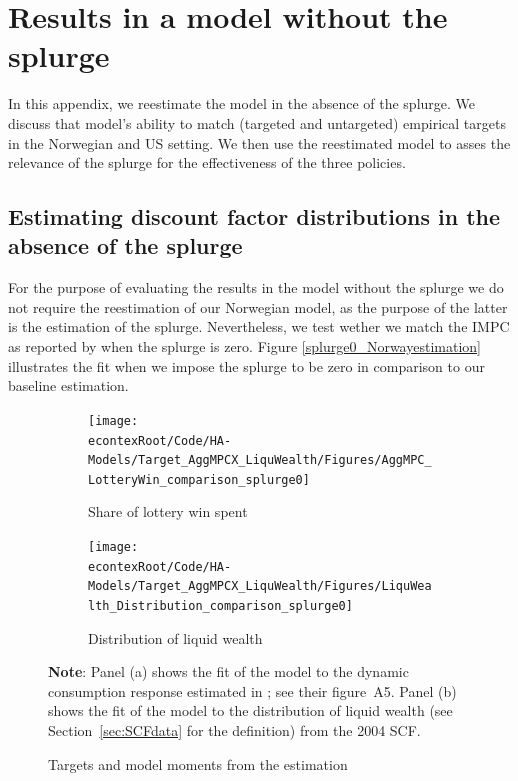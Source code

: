 \documentclass[\econtexRoot/HAFiscal]{subfiles}
\begin{document}
\FloatBarrier

\hypertarget{Model_without_splurge}{}\par\section{Results in a model without the splurge}
\notinsubfile{\label{app:Model_without_splurge}}

In this appendix, we reestimate the model in the absence of the splurge. We discuss that model's ability to match (targeted and untargeted) empirical targets in the Norwegian and US setting. We then use the reestimated model to asses the relevance of the splurge for the effectiveness of the three policies. 


\subsection{Estimating discount factor distributions in the absence of the splurge}

For the purpose of evaluating the results in the model without the splurge we do not require the reestimation of our Norwegian model, as the purpose of the latter is the estimation of the splurge. Nevertheless, we test wether we match the IMPC as reported by \citet{fagereng_mpc_2021} when the splurge is zero. Figure \ref{splurge0_Norwayestimation} illustrates the fit when we impose the splurge to be zero in comparison to our baseline estimation. 

\begin{figure}[htb]
	\centering
	\begin{subfigure}[b]{.48\linewidth}
		\centering
		\texttt{[image: \\econtexRoot/Code/HA-Models/Target\_AggMPCX\_LiquWealth/Figures/AggMPC\_LotteryWin\_comparison\_splurge0]}
		\caption{Share of lottery win spent}
		\notinsubfile{\label{fig:aggmpclotterywin}}
	\end{subfigure}
	\begin{subfigure}[b]{.48\linewidth}
		\centering
		\texttt{[image: \\econtexRoot/Code/HA-Models/Target\_AggMPCX\_LiquWealth/Figures/LiquWealth\_Distribution\_comparison\_splurge0]}
		\caption{Distribution of liquid wealth}
		\notinsubfile{\label{fig:liquwealthdistribution}}
	\end{subfigure}%
	\caption{Targets and model moments from the estimation}
	\notinsubfile{\label{fig:splurge0_Norwayestimation}}
	\parbox{16cm}{\small \vspace{.15cm} \textbf{Note}: Panel (a) shows the fit of the model to the dynamic consumption response estimated in \citet{fagereng_mpc_2021}; see their figure~A5. Panel (b) shows the fit of the model to the distribution of liquid wealth (see Section~\ref{sec:SCFdata} for the definition) from the 2004 SCF.\normalsize}
\end{figure}
\end{document}
